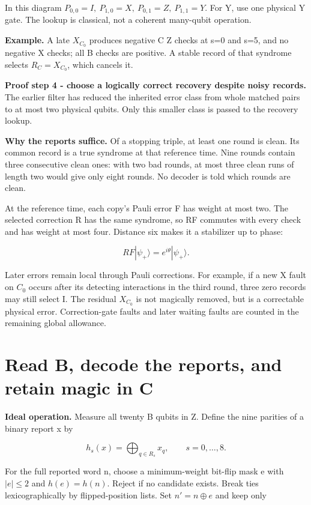 \documentclass[11pt]{article}
\begin{document}
In this diagram \(P_{0,0}=I,\ P_{1,0}=X,\ P_{0,1}=Z,\ P_{1,1}=Y\). For Y, use one physical Y gate. The lookup is classical, not a coherent many-qubit operation.

\textbf{Example.} A late \(X_{C_0}\) produces negative C Z checks at s=0 and s=5, and no negative X checks; all B checks are positive. A stable record of that syndrome selects \(R_C=X_{C_0}\), which cancels it.

\textbf{Proof step 4 - choose a logically correct recovery despite noisy records.} The earlier filter has reduced the inherited error class from whole matched pairs to at most two physical qubits. Only this smaller class is passed to the recovery lookup.

\textbf{Why the reports suffice.} Of a stopping triple, at least one round is clean. Its common record is a true syndrome at that reference time. Nine rounds contain three consecutive clean ones: with two bad rounds, at most three clean runs of length two would give only eight rounds. No decoder is told which rounds are clean.

At the reference time, each copy's Pauli error F has weight at most two. The selected correction R has the same syndrome, so RF commutes with every check and has weight at most four. Distance six makes it a stabilizer up to phase:

\[
RF|\psi_+\rangle=e^{i\theta}|\psi_+\rangle.
\]

Later errors remain local through Pauli corrections. For example, if a new X fault on \(C_0\) occurs after its detecting interactions in the third round, three zero records may still select I. The residual \(X_{C_0}\) is not magically removed, but is a correctable physical error. Correction-gate faults and later waiting faults are counted in the remaining global allowance.

\section{Read B, decode the reports, and retain magic in C}
\textbf{Ideal operation.} Measure all twenty B qubits in Z. Define the nine parities of a binary report x by

\[
h_s(x)=\bigoplus_{q\in R_s}x_q,\qquad s=0,\ldots,8.
\]

For the full reported word n, choose a minimum-weight bit-flip mask e with \(|e|\le2\) and \(h(e)=h(n)\). Reject if no candidate exists. Break ties lexicographically by flipped-position lists. Set \(n'=n\oplus e\) and keep only
\end{document}
